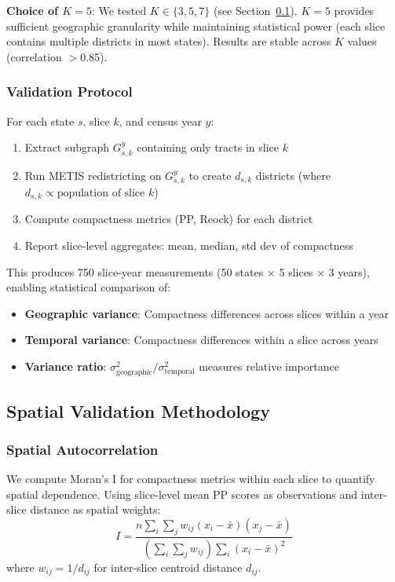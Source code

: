 \textbf{Choice of $K=5$}: We tested $K \in \{3, 5, 7\}$ (see Section~\ref{sec:spatial-validation}). $K=5$ provides sufficient geographic granularity while maintaining statistical power (each slice contains multiple districts in most states). Results are stable across $K$ values (correlation $>$0.85).

\subsubsection{Validation Protocol}

For each state $s$, slice $k$, and census year $y$:
\begin{enumerate}
    \item Extract subgraph $G_{s,k}^y$ containing only tracts in slice $k$
    \item Run METIS redistricting on $G_{s,k}^y$ to create $d_{s,k}$ districts (where $d_{s,k} \propto \text{population of slice } k$)
    \item Compute compactness metrics (PP, Reock) for each district
    \item Report slice-level aggregates: mean, median, std dev of compactness
\end{enumerate}

This produces 750 slice-year measurements (50 states × 5 slices × 3 years), enabling statistical comparison of:
\begin{itemize}
    \item \textbf{Geographic variance}: Compactness differences across slices within a year
    \item \textbf{Temporal variance}: Compactness differences within a slice across years
    \item \textbf{Variance ratio}: $\sigma^2_{\text{geographic}} / \sigma^2_{\text{temporal}}$ measures relative importance
\end{itemize}

\subsection{Spatial Validation Methodology}
\label{sec:spatial-validation}

\subsubsection{Spatial Autocorrelation}

We compute Moran's I for compactness metrics within each slice to quantify spatial dependence. Using slice-level mean PP scores as observations and inter-slice distance as spatial weights:
\[
I = \frac{n \sum_i \sum_j w_{ij}(x_i - \bar{x})(x_j - \bar{x})}{(\sum_i \sum_j w_{ij}) \sum_i (x_i - \bar{x})^2}
\]
where $w_{ij} = 1/d_{ij}$ for inter-slice centroid distance $d_{ij}$.

